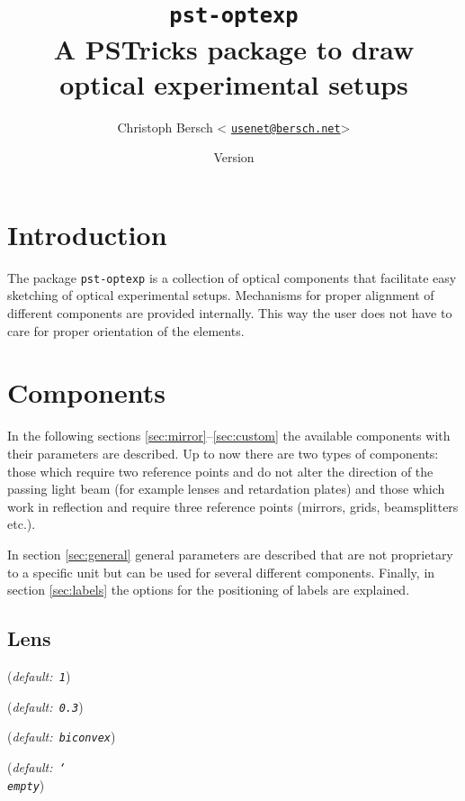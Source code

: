 \documentclass[headinclude,DIV12]{scrartcl}
\makeatletter
\let\verPstOptExp\fileversion
\let\datePstOptExp\filedate
\DeclareRobustCommand\cs[1]{\texttt{\char`\\#1}}
\let\param\textrm
\renewenvironment{description}
  {\list{}{\labelwidth\z@ \itemindent-\leftmargin
    \itemsep0pt \parsep0pt
    \let\makelabel\descriptionlabel}}
  {\endlist}
\makeatother
\begin{document}
 \title{\texttt{pst-optexp}\\ A PSTricks package to draw optical experimental setups}
 \author{Christoph Bersch \textless
   \href{mailto:usenet@bersch.net}{\texttt{usenet@bersch.net}}\textgreater}
 \date{\datePstOptExp\enspace\enspace Version \verPstOptExp}

\maketitle

\setlength{\columnseprule}{0.6pt}
\begin{multicols}{2}
{\parskip 0pt \tableofcontents}
\end{multicols}
\section{Introduction}
The package \texttt{pst-optexp} is a collection of optical components
that facilitate easy sketching of optical experimental
setups. Mechanisms for proper alignment of different components are
provided internally. This way the user does not have to care for proper
orientation of the elements.

\section{Components}

In the following sections \ref{sec:mirror}--\ref{sec:custom} the
available components with their parameters are described. Up to now
there are two types of components: those which require two reference
points and do not alter the direction of the passing light beam (for
example lenses and retardation plates) and those which work in
reflection and require three reference points (mirrors, grids,
beamsplitters etc.).

In section \ref{sec:general} general parameters are described that are not proprietary
to a specific unit but can be used for several different components. Finally, in
section \ref{sec:labels} the options for the positioning of labels are
explained.

\subsection{Lens}\label{sec:lens}

\begin{description}
\item[\param{lensheight} (dimension):] (\emph{default:~\texttt{1}})
\item[\param{lenswidth} (dimension):] (\emph{default:~\texttt{0.3}})
\item[\param{lenstype} (plainconvex, plainconcave, convexplain, concaveplain, biconvex, biconcave):] (\emph{default:~\texttt{biconvex}})
\item[\param{lensradius} (dimension):] (\emph{default:~\texttt{\cs{empty}}})
\end{description}
\end{document}
